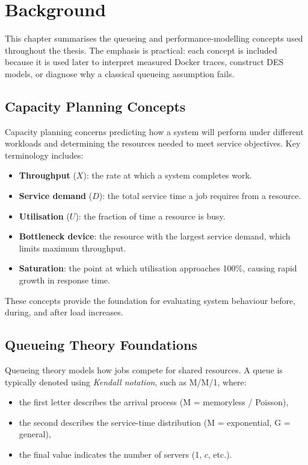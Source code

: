 ﻿\chapter{Background}\label{ch:background}

This chapter summarises the queueing and performance-modelling concepts used throughout the thesis. The emphasis is practical: each concept is included because it is used later to interpret measured Docker traces, construct DES models, or diagnose why a classical queueing assumption fails.

\section{Capacity Planning Concepts}

Capacity planning concerns predicting how a system will perform under
different workloads and determining the resources needed to meet service
objectives. Key terminology includes:

\begin{itemize}
    \item \textbf{Throughput} ($X$): the rate at which a system completes work.
    \item \textbf{Service demand} ($D$): the total service time a job
          requires from a resource.
    \item \textbf{Utilisation} ($U$): the fraction of time a resource is busy.
    \item \textbf{Bottleneck device}: the resource with the largest
          service demand, which limits maximum throughput.
    \item \textbf{Saturation}: the point at which utilisation approaches
          100\%, causing rapid growth in response time.
\end{itemize}

These concepts provide the foundation for evaluating system behaviour
before, during, and after load increases.

\section{Queueing Theory Foundations}

Queueing theory models how jobs compete for shared resources. A queue is
typically denoted using \emph{Kendall notation}, such as M/M/1, where:

\begin{itemize}
    \item the first letter describes the arrival process (M = memoryless / Poisson),
    \item the second describes the service-time distribution 
          (M = exponential, G = general),
    \item the final value indicates the number of servers (1, $c$, etc.).
\end{itemize}

